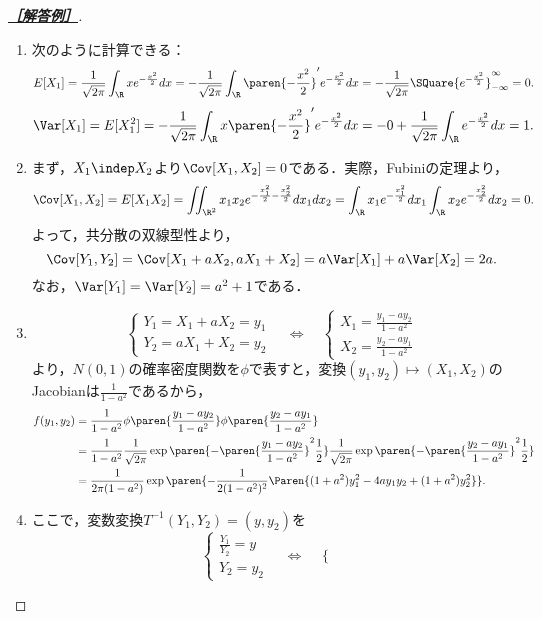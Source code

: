 \documentclass[uplatex,dvipdfmx]{jsarticle}
\begin{document}
\begin{proof}[\textbf{\underline{［解答例］}}]\mbox{}
    \begin{enumerate}
        \item 次のように計算できる：
        \[E[X_1]=\frac{1}{\sqrt{2\pi}}\int_\R xe^{-\frac{x^2}{2}}dx=-\frac{1}{\sqrt{2\pi}}\int_\R\paren{-\frac{x^2}{2}}'e^{-\frac{x^2}{2}}dx=-\frac{1}{\sqrt{2\pi}}\SQuare{e^{-\frac{x^2}{2}}}^\infty_{-\infty}=0.\]
        \[\Var[X_1]=E[X_1^2]=-\frac{1}{\sqrt{2\pi}}\int_\R x\paren{-\frac{x^2}{2}}'e^{-\frac{x^2}{2}}dx=-0+\frac{1}{\sqrt{2\pi}}\int_\R e^{-\frac{x^2}{2}}dx=1.\]
        \item まず，$X_1\indep X_2$より$\Cov[X_1,X_2]=0$である．実際，Fubiniの定理より，
        \[\Cov[X_1,X_2]=E[X_1X_2]=\iint_{\R^2}x_1x_2e^{-\frac{x_1^2}{2}-\frac{x_2^2}{2}}dx_1dx_2=\int_{\R}x_1e^{-\frac{x_1^2}{2}}dx_1\int_\R x_2e^{-\frac{x_2^2}{2}}dx_2=0.\]
        よって，共分散の双線型性より，
        \[\Cov[Y_1,Y_2]=\Cov[X_1+aX_2,aX_1+X_2]=a\Var[X_1]+a\Var[X_2]=2a.\]
        なお，$\Var[Y_1]=\Var[Y_2]=a^2+1$である．
        \item \[\begin{cases}
            Y_1=X_1+aX_2=y_1\\
            Y_2=aX_1+X_2=y_2
        \end{cases}\quad\Leftrightarrow\quad\begin{cases}
            X_1=\frac{y_1-ay_2}{1-a^2}\\
            X_2=\frac{y_2-ay_1}{1-a^2}
        \end{cases}\]
        より，$N(0,1)$の確率密度関数を$\phi$で表すと，変換$(y_1,y_2)\mapsto(X_1,X_2)$のJacobianは$\frac{1}{1-a^2}$であるから，
        \begin{align*}
            f(y_1,y_2)&=\frac{1}{1-a^2}\phi\paren{\frac{y_1-ay_2}{1-a^2}}\phi\paren{\frac{y_2-ay_1}{1-a^2}}\\
            &=\frac{1}{1-a^2}\frac{1}{\sqrt{2\pi}}\exp\paren{-\paren{\frac{y_1-ay_2}{1-a^2}}^2\frac{1}{2}}\frac{1}{\sqrt{2\pi}}\exp\paren{-\paren{\frac{y_2-ay_1}{1-a^2}}^2\frac{1}{2}}\\
            &=\frac{1}{2\pi(1-a^2)}\exp\paren{-\frac{1}{2(1-a^2)^2}\Paren{(1+a^2)y_1^2-4ay_1y_2+(1+a^2)y_2^2}}.
        \end{align*}
        \item ここで，変数変換$T^{-1}(Y_1,Y_2)=(y,y_2)$を
        \[\begin{cases}
            \frac{Y_1}{Y_2}=y\\
            Y_2=y_2
        \end{cases}\quad\Leftrightarrow\quad\begin{cases}

\end{cases}\]
\end{enumerate}
\end{proof}
\end{document}
